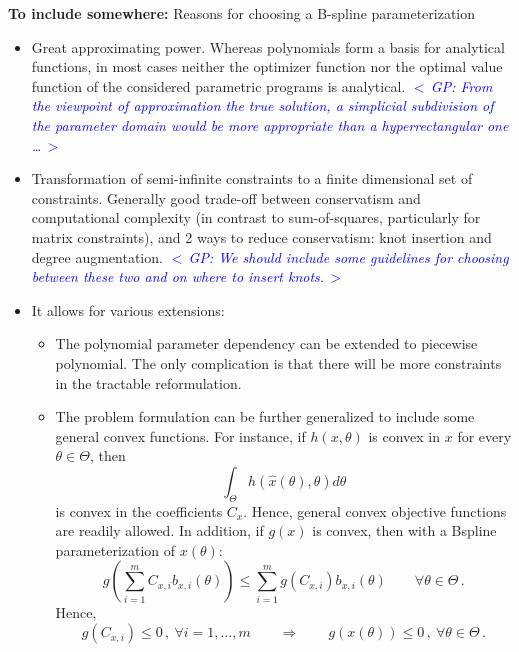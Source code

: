 \documentclass{article}
\newcommand{\ppar}{\theta}                  %
\newcommand{\Ppar}{\Theta}                  %
\newcommand{\commentGP}[1]{\noindent \textcolor{blue}{\emph{$<\,$GP: #1$\,>$}}}%
\begin{document}
\vspace*{12pt}
\noindent\textbf{To include somewhere:} Reasons for choosing a B-spline parameterization
\begin{itemize}
\item Great approximating power. Whereas polynomials form a basis for analytical functions, in most cases neither the optimizer function nor the optimal value function of the considered parametric programs is analytical. \commentGP{From the viewpoint of approximation the true solution, a simplicial subdivision of the parameter domain would be more appropriate than a hyperrectangular one \ldots}
\item Transformation of semi-infinite constraints to a finite dimensional set of constraints. Generally good trade-off between conservatism and computational complexity (in contrast to sum-of-squares, particularly for matrix constraints), and 2 ways to reduce conservatism: knot insertion and degree augmentation. \commentGP{We should include some guidelines for choosing between these two and on where to insert knots.}
\item It allows for various extensions:
    \begin{itemize}
    \item The polynomial parameter dependency can be extended to piecewise polynomial. The only complication is that there will be more constraints in the tractable reformulation.
    \item The problem formulation can be further generalized to include some general convex functions. For instance, if $h(x,\ppar)$ is convex in $x$ for every $\ppar\in\Ppar$, then
        \[ \int_{\Ppar} h(\hat{x}(\ppar), \ppar) d\ppar
        \]
        is convex in the coefficients $C_x$. Hence, general convex objective functions are readily allowed. In addition, if $g(x)$ is convex, then with a Bspline parameterization of $x(\ppar)$:
        \[ g\left(\sum_{i=1}^m C_{x,i} b_{x,i}(\ppar)\right) \leq \sum_{i=1}^m g(C_{x,i}) b_{x,i}(\ppar) \qquad \forall \ppar\in\Ppar\,. %
        \]
        Hence,
        \[ g(C_{x,i})\leq 0\,,~\forall i=1,\ldots,m \qquad \Rightarrow \qquad g(x(\ppar))\leq0\,,~\forall \ppar\in\Ppar\,.%
        \]
        \end{itemize}
\end{itemize}
\end{document}
